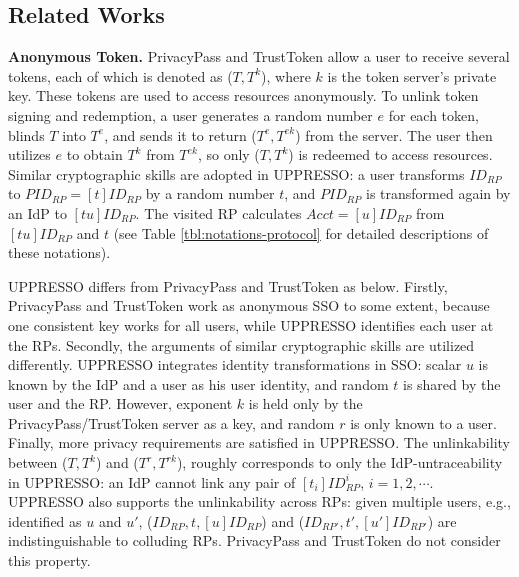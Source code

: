 \subsection{Related Works}%
\label{sec:related}

\noindent\textbf{Anonymous Token.}
%
PrivacyPass and TrustToken \cite{privacypass,trusttoken} allow a user to receive several tokens, each of which is denoted as ($T, T^{k}$), where $k$ is the token server's private key.
 These tokens are used to access resources anonymously.
To unlink token signing and redemption,
    a user generates a random number $e$ for each token, blinds $T$ into $T^{e}$,
        and sends it to return ($T^e, T^{ek}$) from the server.
The user then utilizes $e$ to obtain $T^k$ from $T^{ek}$, so only ($T, T^{k}$) is redeemed to access resources.
Similar cryptographic skills are adopted in UPPRESSO:
    a user transforms $ID_{RP}$ to $PID_{RP} = [t]ID_{RP}$ by a random number $t$,
 and $PID_{RP}$ is transformed again by an IdP to $[tu]ID_{RP}$.
The visited RP calculates $Acct = [u]ID_{RP}$ from $[tu]ID_{RP}$ and $t$
 (see Table \ref{tbl:notations-protocol} for detailed descriptions of these notations).

UPPRESSO differs from PrivacyPass and TrustToken as below.
Firstly,
    PrivacyPass and TrustToken work as anonymous SSO to some extent, because one consistent key works for all users,
while UPPRESSO identifies each user at the RPs.
Secondly,
   the arguments of similar cryptographic skills are utilized differently.
UPPRESSO integrates identity transformations in SSO:
scalar $u$ is known by the IdP and a user as his user identity, and
random $t$ is shared by the user and the RP. However,
exponent $k$ is held only by the PrivacyPass/TrustToken server as a key,
 and random $r$ is only known to a user.
Finally,
more privacy requirements are satisfied in UPPRESSO.
The unlinkability between %
 ($T, T^k$) and ($T^r, T^{rk}$),
roughly corresponds to only the IdP-untraceability in UPPRESSO:
 an IdP cannot link any pair of $[t_i]ID^i_{RP}$,
 $i = 1, 2, \cdots$.
UPPRESSO also supports the unlinkability across RPs:
given multiple users, e.g., identified as $u$ and $u'$,
    ($ID_{RP}, t, [u]ID_{RP}$) and ($ID_{RP'}, t', [u']ID_{RP'}$) are indistinguishable to
    colluding RPs.
PrivacyPass and TrustToken do not consider this property.

